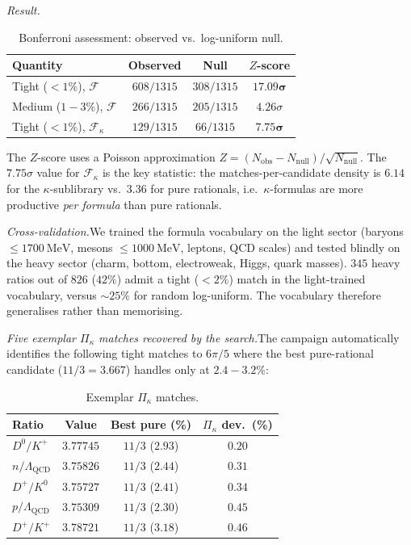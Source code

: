 \documentclass[aps,prl,reprint,amsmath,amssymb,nofootinbib,floatfix,superscriptaddress]{revtex4-2}
\newcommand{\calF}{\mathcal{F}}
\newcommand{\Piskappa}{\Pi_{\kappa}}
\begin{document}
\textit{Result.}\quad

\begin{table}[h]
\caption{Bonferroni assessment: observed vs.\ log-uniform null.}
\label{tab:bonferroni}
\begin{ruledtabular}
\begin{tabular}{lccc}
Quantity & Observed & Null & $Z$-score \\
\hline
Tight ($<1\%$), $\calF$       & $608/1315$ & $308/1315$ & $\mathbf{17.09\sigma}$ \\
Medium ($1\!-\!3\%$), $\calF$ & $266/1315$ & $205/1315$ & $4.26\sigma$ \\
Tight ($<1\%$), $\calF_\kappa$ & $129/1315$ & $66/1315$  & $\mathbf{7.75\sigma}$ \\
\end{tabular}
\end{ruledtabular}
\end{table}

The $Z$-score uses a Poisson approximation $Z = (N_{\mathrm{obs}} - N_{\mathrm{null}})/\sqrt{N_{\mathrm{null}}}$. The $7.75\sigma$ value for $\calF_\kappa$ is the key statistic: the matches-per-candidate density is $6.14$ for the $\kappa$-sublibrary vs.\ $3.36$ for pure rationals, i.e.\ $\kappa$-formulas are more productive \emph{per formula} than pure rationals.

\textit{Cross-validation.}\quad We trained the formula vocabulary on the light sector (baryons $\le 1700~\mathrm{MeV}$, mesons $\le 1000~\mathrm{MeV}$, leptons, QCD scales) and tested blindly on the heavy sector (charm, bottom, electroweak, Higgs, quark masses). $345$ heavy ratios out of $826$ ($42\%$) admit a tight ($< 2\%$) match in the light-trained vocabulary, versus ${\sim}25\%$ for random log-uniform. The vocabulary therefore generalises rather than memorising.

\textit{Five exemplar $\Piskappa$ matches recovered by the search.}\quad The campaign automatically identifies the following tight matches to $6\pi/5$ where the best pure-rational candidate ($11/3 = 3.667$) handles only at $2.4{-}3.2\%$:

\begin{table}[h]
\caption{Exemplar $\Piskappa$ matches.}
\label{tab:five-matches}
\begin{ruledtabular}
\begin{tabular}{lccc}
Ratio & Value & Best pure (\%) & $\Piskappa$ dev.~(\%) \\
\hline
$D^0 / K^+$ & $3.77745$ & $11/3$ ($2.93$) & $0.20$ \\
$n / \Lambda_{\mathrm{QCD}}$ & $3.75826$ & $11/3$ ($2.44$) & $0.31$ \\
$D^+ / K^0$ & $3.75727$ & $11/3$ ($2.41$) & $0.34$ \\
$p / \Lambda_{\mathrm{QCD}}$ & $3.75309$ & $11/3$ ($2.30$) & $0.45$ \\
$D^+ / K^+$ & $3.78721$ & $11/3$ ($3.18$) & $0.46$ \\
\end{tabular}
\end{ruledtabular}
\end{table}
\end{document}
